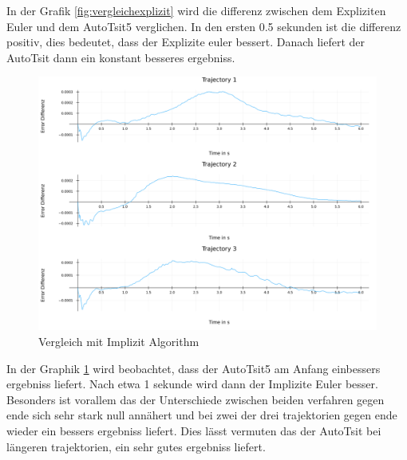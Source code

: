In der Grafik \ref{fig:vergleichexplizit} wird die differenz zwischen dem Expliziten Euler und dem AutoTsit5 verglichen.
In den ersten 0.5 sekunden ist die differenz positiv, dies bedeutet, dass
der Explizite euler bessert.
Danach liefert der AutoTsit dann ein konstant besseres ergebniss.

\begin{figure}[h]
    \centering
    \includegraphics[width=\textwidth]{Data/03_Ergebnisse/autoswitching/errors_implizit_composit.png}
    \caption{Vergleich mit Implizit Algorithm}
    \label{fig:vergleichimplizit}
\end{figure}

In der Graphik \ref{fig:vergleichimplizit} wird beobachtet,
dass der AutoTsit5 am Anfang einbessers ergebniss liefert.
Nach etwa 1 sekunde wird dann der Implizite Euler besser.
Besonders ist vorallem das der Unterschiede zwischen beiden verfahren gegen ende sich sehr stark null annähert und bei zwei der drei trajektorien gegen ende wieder ein bessers ergebniss liefert.
Dies lässt vermuten das der AutoTsit bei längeren trajektorien, ein sehr gutes ergebniss liefert.
